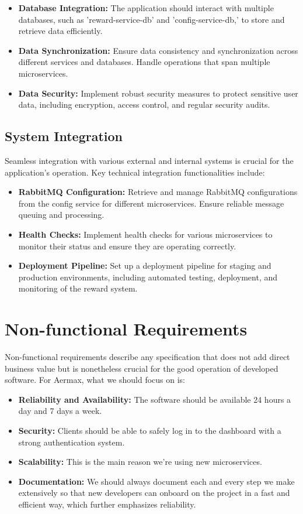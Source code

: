 \begin{itemize}
    \item \textbf{Database Integration:} The application should interact with multiple databases, such as 'reward-service-db' and 'config-service-db,' to store and retrieve data efficiently.
    \item \textbf{Data Synchronization:} Ensure data consistency and synchronization across different services and databases. Handle operations that span multiple microservices.
    \item \textbf{Data Security:} Implement robust security measures to protect sensitive user data, including encryption, access control, and regular security audits.
\end{itemize}

\subsection{System Integration}
Seamless integration with various external and internal systems is crucial for the application's operation. Key technical integration functionalities include:

\begin{itemize}
    \item \textbf{RabbitMQ Configuration:} Retrieve and manage RabbitMQ configurations from the config service for different microservices. Ensure reliable message queuing and processing.
    \item \textbf{Health Checks:} Implement health checks for various microservices to monitor their status and ensure they are operating correctly.
    \item \textbf{Deployment Pipeline:} Set up a deployment pipeline for staging and production environments, including automated testing, deployment, and monitoring of the reward system.
\end{itemize}


\section{Non-functional Requirements}
Non-functional requirements describe any specification that does not add direct business value but is nonetheless crucial for the good operation of developed software.
For Aermax, what we should focus on is:
\begin{itemize}
	\item \textbf{Reliability and Availability:} The software should be available 24 hours a day and 7 days a week.
	\item \textbf{Security:} Clients should be able to safely log in to the dashboard with a strong authentication system.
	\item \textbf{Scalability:} This is the main reason we're using new microservices.
	\item \textbf{Documentation:} We should always document each and every step we make extensively so that new developers can onboard on the project in a fast and efficient way, which further emphasizes reliability.
\end{itemize}


